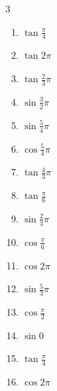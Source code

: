\begin{multicols}{3}
\begin{enumerate}
  \item $\displaystyle \tan{\frac{\pi}{4}}$
        \phantom{$\displaystyle =1$}

  \item $\displaystyle \tan{2\pi}$
        \phantom{$\displaystyle =0$}

  \item $\displaystyle \tan{\frac{2}{3}\pi}$

  \item $\displaystyle \sin{\frac{3}{2}\pi}$
        \phantom{$\displaystyle =-1$}

  \item $\displaystyle \sin{\frac{5}{4}\pi}$

  \item $\displaystyle \cos{\frac{5}{4}\pi}$

  \item $\displaystyle \tan{\frac{4}{3}\pi}$

  \item $\displaystyle \tan{\frac{\pi}{6}}$

  \item $\displaystyle \sin{\frac{2}{3}\pi}$

  \item $\displaystyle \cos{\frac{\pi}{6}}$

  \item $\displaystyle \cos{2\pi}$
        \phantom{$\displaystyle =1$}

  \item $\displaystyle \sin{\frac{5}{3}\pi}$

  \item $\displaystyle \cos{\frac{\pi}{2}}$
        \phantom{$\displaystyle =0$}

  \item $\displaystyle \sin{0}$
        \phantom{$\displaystyle =0$}

\columnbreak %

  \item $\displaystyle \tan{\frac{\pi}{4}}$
        \phantom{$\displaystyle =1$}

  \item $\displaystyle \cos{2\pi}$
        \phantom{$\displaystyle =1$}


\end{enumerate}
\end{multicols}
